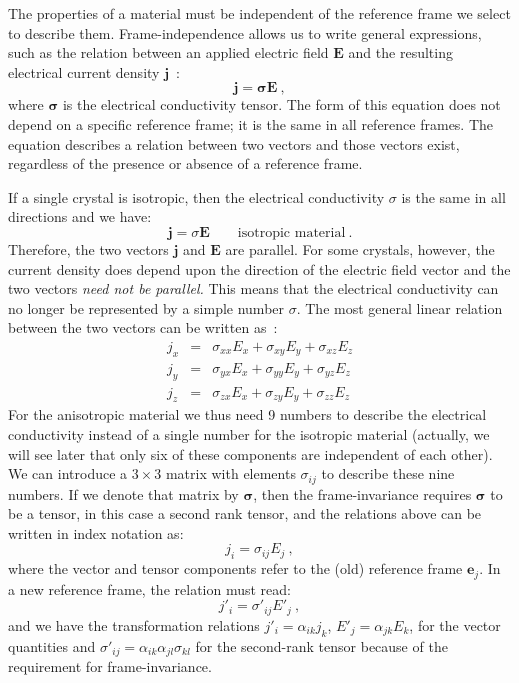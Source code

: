 The properties of a material must be independent of the reference frame we select to describe them.  Frame-independence allows us to write general expressions, such as the relation between an applied electric field $\mathbf{E}$ and the resulting electrical current density $\mathbf{j}$~:
\begin{equation}
	\mathbf{j}=\bm{\sigma}\mathbf{E}\ ,\label{\chabbr:eq:conductivity}
\end{equation}
where $\bm{\sigma}$ is the electrical conductivity tensor.  
The form of this equation does not depend on a specific reference frame; it is the same in all reference  frames. The equation describes a relation between two vectors and those vectors exist, regardless of the presence or absence of a reference frame.  \

If a single crystal is isotropic, then the electrical conductivity $\sigma$ is the same in all directions and we have:
\[
	\mathbf{j}=\sigma\mathbf{E}\qquad\mbox{isotropic material}\ .
\]
Therefore, the two vectors $\mathbf{j}$ and $\mathbf{E}$ are parallel.  For some crystals, however, the current density does depend upon the direction of the electric field vector and the two vectors \textit{need not be parallel.} This means that the electrical conductivity can no longer be represented by a simple number $\sigma$.  The most general linear relation between the two vectors can be  written as~:
\begin{eqnarray}
j_x &=& \sigma_{xx} E_x + \sigma_{xy} E_y + \sigma_{xz} E_z\nonumber\\
j_y &=& \sigma_{yx} E_x + \sigma_{yy} E_y + \sigma_{yz} E_z\\
j_z &=& \sigma_{zx} E_x + \sigma_{zy} E_y + \sigma_{zz} E_z\nonumber
\end{eqnarray}
For the anisotropic material we thus need 9 numbers to describe the electrical conductivity instead of a single number for the isotropic material (actually, we will see later that only six of these components are independent of each other).  We can introduce a $3\times 3$ matrix with elements $\sigma_{ij}$ to describe these nine numbers.  If we denote that matrix by $\bm{\sigma}$, then the frame-invariance requires $\bm{\sigma}$ to be a tensor, in this case a second rank tensor, and the relations above can be written in index notation as:
\[
	j_i = \sigma_{ij} E_j\ ,
\]
where the vector and tensor components refer to the (old) reference frame $\mathbf{e}_j$.  In a new reference frame, the relation must read:
\[
	j'_i = \sigma'_{ij} E'_j\ ,
\]
and we have the transformation relations $j'_i=\alpha_{ik}j_k$, $E'_j=\alpha_{jk}E_k$, for the vector quantities and $\sigma'_{ij}=\alpha_{ik}\alpha_{jl}\sigma_{kl}$ for the second-rank tensor because of the requirement for frame-invariance.


